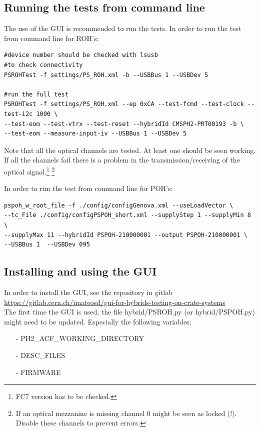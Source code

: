 \documentclass[10pt,a4paper]{article}
\begin{document}
\subsection{Running the tests from command line}
The use of the GUI is recommended to run the tests. 
In order to run the test from command line for ROH's:
\begin{framed}
\begin{verbatim}
#device number should be checked with lsusb
#to check connectivity
PSROHTest -f settings/PS_ROH.xml -b --USBBus 1 --USBDev 5 

#run the full test
PSROHTest -f settings/PS_ROH.xml --ep 0xCA --test-fcmd --test-clock --test-i2c 1000 \
--test-eom --test-vtrx --test-reset --hybridId CMSPH2-PRT00193 -b \
--test-eom --measure-input-iv --USBBus 1 --USBDev 5
\end{verbatim}
\end{framed}
Note that all the optical channels are tested. At least one should be seen working.
If all the channels fail there is a problem in the transmission/receiving of the optical signal.\footnote[1]{FC7 version has to be checked.}
\footnote[2]{If an optical mezzanine is missing channel 0 might be seen as locked (!). Disable these channels to prevent errors.}

In order to run the test from command line for POH's:
\begin{framed}
\begin{verbatim}
pspoh_w_root_file -f ./config/configGenova.xml --useLoadVector \
--tc_File ./config/configPSPOH_short.xml --supplyStep 1 --supplyMin 8 \
--supplyMax 11 --hybridId PSPOH-210000001 --output PSPOH-210000001 \
--USBBus 1  --USBDev 095
\end{verbatim}
\end{framed}


\subsection{Installing and using the GUI}
In order to install the GUI, see the repository in gitlab \\
\url{https://gitlab.cern.ch/imateosd/gui-for-hybrids-testing-on-crate-systems}\\

The first time the GUI is used, the file hybrid/PSROH.py (or hybrid/PSPOH.py) might need to be updated. Especially the following variables:
\begin{itemize}
\item[-] PH2\_ACF\_WORKING\_DIRECTORY
\item[-] DESC\_FILES
\item[-] FIRMWARE
\end{itemize}
\end{document}
